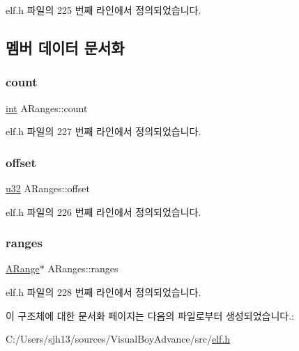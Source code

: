 elf.\+h 파일의 225 번째 라인에서 정의되었습니다.



\subsection{멤버 데이터 문서화}
\mbox{\label{struct_a_ranges_a6f197b7ddb2b3cb334c2eeb9de8d7288}} 
\subsubsection{\texorpdfstring{count}{count}}
{\footnotesize\ttfamily \mbox{\hyperlink{_util_8cpp_a0ef32aa8672df19503a49fab2d0c8071}{int}} A\+Ranges\+::count}



elf.\+h 파일의 227 번째 라인에서 정의되었습니다.

\mbox{\label{struct_a_ranges_ac9a8655acb6be1e8f52053fc49c34efa}} 
\subsubsection{\texorpdfstring{offset}{offset}}
{\footnotesize\ttfamily \mbox{\hyperlink{_system_8h_a10e94b422ef0c20dcdec20d31a1f5049}{u32}} A\+Ranges\+::offset}



elf.\+h 파일의 226 번째 라인에서 정의되었습니다.

\mbox{\label{struct_a_ranges_a2eb62f0d43045767640b1d0c4dd8191e}} 
\subsubsection{\texorpdfstring{ranges}{ranges}}
{\footnotesize\ttfamily \mbox{\hyperlink{struct_a_range}{A\+Range}}$\ast$ A\+Ranges\+::ranges}



elf.\+h 파일의 228 번째 라인에서 정의되었습니다.



이 구조체에 대한 문서화 페이지는 다음의 파일로부터 생성되었습니다.\+:\begin{DoxyCompactItemize}
\item 
C\+:/\+Users/sjh13/sources/\+Visual\+Boy\+Advance/src/\mbox{\hyperlink{elf_8h}{elf.\+h}}\end{DoxyCompactItemize}
